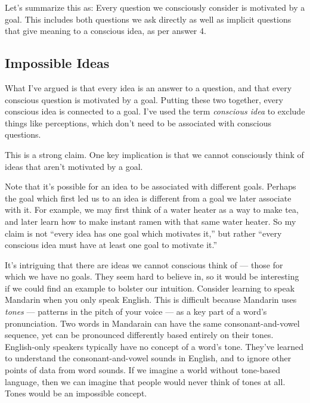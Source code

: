 \documentclass[11pt, oneside]{article}   	%
\newenvironment{answer}[1]
  {\renewcommand\theinnercustomthm{#1}\innercustomthm}
  {\endinnercustomthm}
\begin{document}
\pagebreak

Let's summarize this as:
\begin{answer}{5}
    Every question we consciously consider is motivated by a goal.
\end{answer}
This includes both questions we ask directly as well as
implicit questions that give meaning to a conscious idea, as per
answer 4.

\subsection{Impossible Ideas}

What I've argued is that every idea is an answer to a question, and that every
conscious question is motivated by a goal. Putting these two together,
every
conscious idea is connected to a goal. I've used the term {\em conscious idea}
to exclude things like perceptions, which don't need to be associated with
conscious questions.

This is a strong claim. One key implication is that we cannot consciously
think of ideas that aren't motivated by a goal.

Note that it's possible for an idea to be associated with different goals.
Perhaps the goal which first led us to an idea is
different from a goal we later associate with it. For example, we may first
think of a water heater as a way to make tea, and later learn how to make
instant ramen with that same water heater.
So my claim is not ``every idea has one goal which motivates it,'' but rather
``every conscious idea must have at least one goal to motivate it.''

It's intriguing that there are ideas we cannot conscious think of --- those for
which we have no goals. They seem hard to believe in, so it would be
interesting if we could find an example to bolster our intuition.
Consider learning to speak Mandarin when you only speak English.
This is difficult because Mandarin uses {\em tones} --- patterns in the pitch of
your voice --- as a key part of a word's pronunciation.
Two words in Mandarain can have
the same consonant-and-vowel sequence, yet can be
pronounced differently based entirely on their tones.
English-only speakers typically have no concept of a word's tone.
They've learned to understand the consonant-and-vowel sounds in English, and to
ignore other points of data from word sounds. If we imagine a world without
tone-based language, then we can imagine that people would never think of
tones at all. Tones would be an impossible concept.
\end{document}
